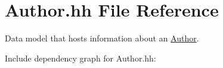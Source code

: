 \hypertarget{_author_8hh}{}\section{Author.\+hh File Reference}
\label{_author_8hh}


Data model that hosts information about an \hyperlink{class_author}{Author}.  


Include dependency graph for Author.\+hh\+:
